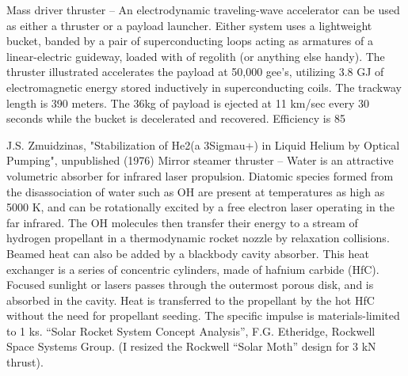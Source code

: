 \documentclass[a4paper]{book}
\begin{document}
Mass driver thruster – An electrodynamic traveling-wave accelerator can be used as either a thruster or a payload launcher. Either system uses a lightweight bucket, banded by a pair of su­perconducting loops act­ing as armatures of a linear-electric guideway, loaded with of regolith (or anything else handy).  The thruster illustrated accelerates the payload at 50,000 gee's, utilizing 3.8 GJ of electromagnetic energy stored inductively in supercon­ducting coils.  The trackway length is 390 meters. The 36kg of payload is ejected at 11 km/sec every 30 seconds while the bucket is decelerated and recovered. Efficiency is 85%
 
J.S. Zmuidzinas, "Stabilization of He2(a 3Sigmau+) in Liquid Helium by Optical Pumping", unpublished (1976) 
Mirror steamer thruster – Water is an attractive volumetric absorber for infrared laser propulsion. Diatomic species formed from the disassociation of water such as OH are present at temperatures as high as 5000 K, and can be rotationally excited by a free electron laser operating in the far infrared. The OH molecules then transfer their energy to a stream of hydrogen propellant in a thermodynamic rocket nozzle by relaxation collisions. Beamed heat can also be added by a blackbody cavity absorber.  This heat exchanger is a series of concentric cylinders, made of hafnium carbide (HfC).  Focused sunlight or lasers passes through the outermost porous disk, and is absorbed in the cavity.  Heat is transferred to the propellant by the hot HfC without the need for propellant seeding.  The specific impulse is materials-limited to 1 ks.
“Solar Rocket System Concept Analysis”, F.G. Etheridge, Rockwell Space Systems Group.  (I resized the Rockwell “Solar Moth” design for 3 kN thrust).
\end{document}
